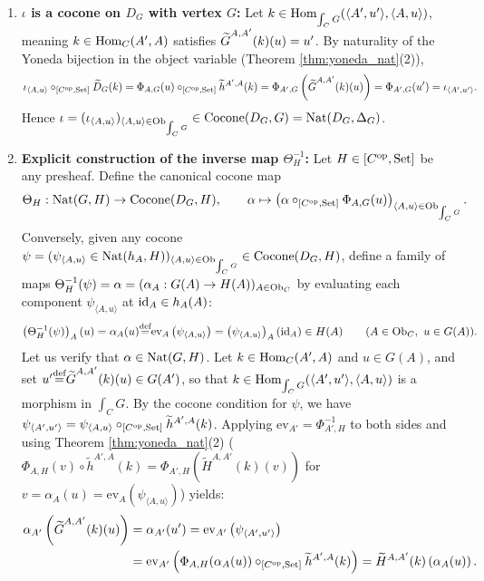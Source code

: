\documentclass[10pt,a4paper]{article}
\begin{document}
\begin{enumerate}
\item \textbf{$\iota$ is a cocone on $D_G$ with vertex $G$:} Let $k \in {\textrm{Hom}}_{\int_C G}(\langle A', u' \rangle, \langle A, u \rangle)$, meaning $k \in {\textrm{Hom}}_C(A', A)$ satisfies ${\widetilde{G}\textrm{}}^{A,A'}(k)(u) = u'$. By naturality of the Yoneda bijection in the object variable (Theorem \ref{thm:yoneda_nat}(2)),
$$\iota_{\langle A, u \rangle} \circ_{[C^{\textrm{op}},{\textrm{Set}}]} \widetilde{D}_G(k) = \Phi_{A,G}(u) \circ_{[C^{\textrm{op}},{\textrm{Set}}]} \widetilde{h}^{A',A}(k) = \Phi_{A',G}\left({\widetilde{G}\textrm{}}^{A,A'}(k)(u)\right) = \Phi_{A',G}(u') = \iota_{\langle A', u' \rangle}.$$
Hence $\iota = (\iota_{\langle A,u\rangle})_{\langle A,u\rangle \in {\textrm{Ob}}_{\int_C G}} \in {\mathrm{Cocone}}(D_G, G) = {\textrm{Nat}}(D_G, \Delta_G)$.
\item \textbf{Explicit construction of the inverse map $\Theta_H^{-1}$:} Let $H \in [C^{\textrm{op}}, {\textrm{Set}}]$ be any presheaf. Define the canonical cocone map
$$\Theta_H : {\textrm{Nat}}(G, H) \to {\mathrm{Cocone}}(D_G, H), \qquad \alpha \mapsto \left(\alpha \circ_{[C^{\textrm{op}},{\textrm{Set}}]} \Phi_{A,G}(u)\right)_{\langle A, u \rangle \in {\textrm{Ob}}_{\int_C G}}.$$
Conversely, given any cocone $\psi = (\psi_{\langle A, u \rangle} \in {\textrm{Nat}}(h_A, H))_{\langle A, u \rangle \in {\textrm{Ob}}_{\int_C G}} \in {\mathrm{Cocone}}(D_G, H)$, define a family of maps $\Theta_H^{-1}(\psi) = \alpha = (\alpha_A : G(A) \to H(A))_{A \in {\textrm{Ob}}_C}$ by evaluating each component $\psi_{\langle A, u \rangle}$ at ${\textrm{id}}_A \in h_A(A)$:
$$\left(\Theta_H^{-1}(\psi)\right)_A(u) = \alpha_A(u) {\stackrel{{\textrm{def}}}{=}} \mathrm{ev}_A\left(\psi_{\langle A, u \rangle}\right) = \left(\psi_{\langle A, u \rangle}\right)_A({\textrm{id}}_A) \in H(A) \qquad (A \in {\textrm{Ob}}_C,\ u \in G(A)).$$
Let us verify that $\alpha \in {\textrm{Nat}}(G, H)$. Let $k \in {\textrm{Hom}}_C(A', A)$ and $u \in G(A)$, and set $u' {\stackrel{{\textrm{def}}}{=}} {\widetilde{G}\textrm{}}^{A,A'}(k)(u) \in G(A')$, so that $k \in {\textrm{Hom}}_{\int_C G}(\langle A', u' \rangle, \langle A, u \rangle)$ is a morphism in $\int_C G$. By the cocone condition for $\psi$, we have $\psi_{\langle A', u' \rangle} = \psi_{\langle A, u \rangle} \circ_{[C^{\textrm{op}},{\textrm{Set}}]} \widetilde{h}^{A',A}(k)$. Applying $\mathrm{ev}_{A'} = \Phi_{A',H}^{-1}$ to both sides and using Theorem \ref{thm:yoneda_nat}(2) ($\Phi_{A,H}(v) \circ \widetilde{h}^{A',A}(k) = \Phi_{A',H}(\widetilde{H}^{A,A'}(k)(v))$ for $v = \alpha_A(u) = \mathrm{ev}_A(\psi_{\langle A,u\rangle})$) yields:
\begin{align*}
\alpha_{A'}\left(\GMor^{A,A'}(k)(u)\right) &= \alpha_{A'}(u') = \mathrm{ev}_{A'}\left(\psi_{\langle A', u' \rangle}\right) \\
&= \mathrm{ev}_{A'}\left(\Phi_{A,H}(\alpha_A(u)) \circ_{[C^\op,\Set]} \widetilde{h}^{A',A}(k)\right) = \widetilde{H}^{A,A'}(k)\left(\alpha_A(u)\right).

\end{align*}
\end{enumerate}
\end{document}
